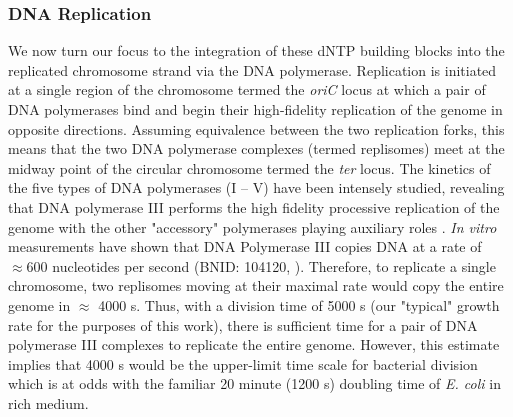 \subsubsection{DNA Replication}
We now turn our focus to the integration of
these dNTP building blocks into the replicated chromosome strand via the DNA
polymerase. Replication is initiated at a
single region of the chromosome termed the \textit{oriC} locus at which a pair
of DNA polymerases bind and begin their high-fidelity replication of the genome
in opposite directions. Assuming equivalence between the two replication forks,
this means that the two DNA polymerase complexes (termed replisomes) meet at the
midway point of the circular chromosome termed the \textit{ter} locus. The
kinetics of the five types of DNA polymerases (I -- V) have been intensely
studied, revealing that DNA polymerase III performs the high fidelity processive
replication of the genome with the other "accessory" polymerases playing
auxiliary roles \citep{fijalkowska2012}. \textit{In vitro} measurements have
shown that DNA Polymerase III copies DNA at a rate of $\approx 600$ nucleotides
per second (BNID: 104120, \cite{milo2010}). Therefore, to replicate a single
chromosome, two replisomes moving at their maximal rate would copy the
entire genome in $\approx$ 4000 s. Thus, with a division time of 5000 s (our
"typical" growth rate for the purposes of this work), there is sufficient time
for a pair of DNA polymerase III complexes to replicate the entire genome.
However, this estimate implies that 4000 s would be the upper-limit time scale
for bacterial division which is at odds with the familiar 20 minute (1200 s)
doubling time of \textit{E. coli} in rich medium.


